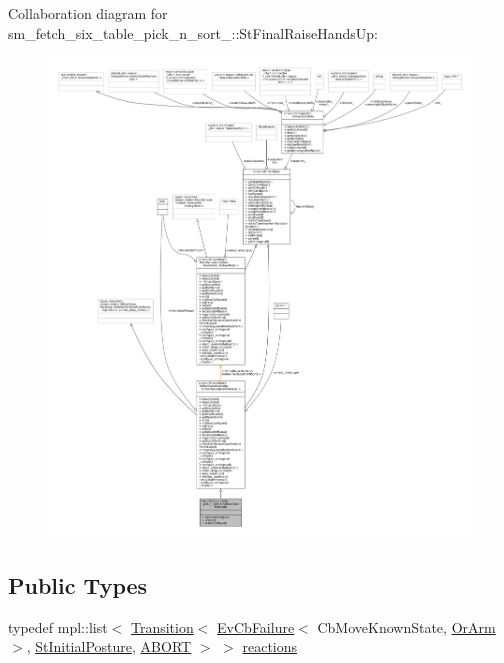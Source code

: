 Collaboration diagram for sm\+\_\+fetch\+\_\+six\+\_\+table\+\_\+pick\+\_\+n\+\_\+sort\+\_\+:\+:St\+Final\+Raise\+Hands\+Up\+:
\nopagebreak
\begin{figure}[H]
\begin{center}
\leavevmode
\includegraphics[width=350pt]{structsm__fetch__six__table__pick__n__sort__1_1_1StFinalRaiseHandsUp__coll__graph}
\end{center}
\end{figure}
\subsection*{Public Types}
\begin{DoxyCompactItemize}
\item 
typedef mpl\+::list$<$ \hyperlink{classsmacc_1_1Transition}{Transition}$<$ \hyperlink{structsmacc_1_1EvCbFailure}{Ev\+Cb\+Failure}$<$ Cb\+Move\+Known\+State, \hyperlink{classsm__fetch__six__table__pick__n__sort__1_1_1OrArm}{Or\+Arm} $>$, \hyperlink{structsm__fetch__six__table__pick__n__sort__1_1_1StInitialPosture}{St\+Initial\+Posture}, \hyperlink{structsmacc_1_1default__transition__tags_1_1ABORT}{A\+B\+O\+RT} $>$ $>$ \hyperlink{structsm__fetch__six__table__pick__n__sort__1_1_1StFinalRaiseHandsUp_aea5e796b5e6ef62ea41fa7333798b1b8}{reactions}
\end{DoxyCompactItemize}
